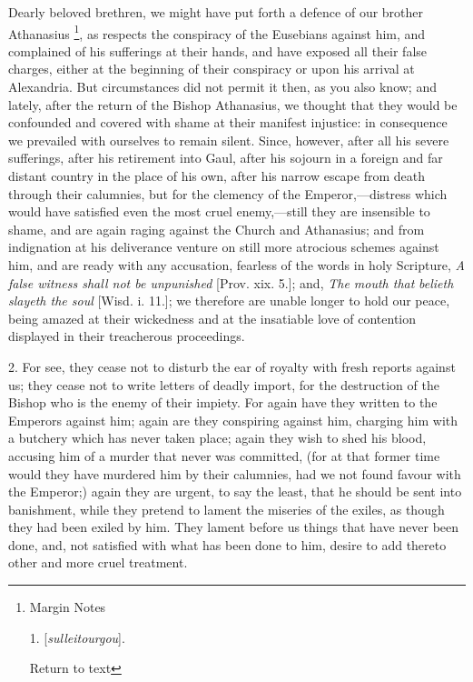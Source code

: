 Dearly beloved brethren, we might have put forth
a defence of our brother Athanasius \footnote{Margin Notes

1. [\emph{sulleitourgou}].

Return to text}, as respects the conspiracy of the Eusebians against him, and
complained of his sufferings at their hands, and have exposed all
their false charges, either at the beginning of their conspiracy or
upon his arrival at Alexandria. But circumstances did not permit it
then, as you also know; and lately, after the return of the Bishop
Athanasius, we thought that they would be confounded and covered with
shame at their manifest injustice: in consequence we prevailed with
ourselves to remain silent. Since, however, after all his severe
sufferings, after his retirement into Gaul, after his sojourn in a
foreign and far distant country in the place of his own, after his
narrow escape from death through their calumnies, but for the clemency
of the Emperor,—distress which would have satisfied even the most
cruel enemy,—still they are insensible to shame, and are again
raging against the Church and Athanasius; and from indignation at his
deliverance venture on still more atrocious schemes against him, and
are ready with any accusation, fearless of the words in holy
Scripture, \emph{A false witness shall not be unpunished} [Prov. xix.
5.]; and, \emph{The mouth that} \emph{belieth slayeth the soul} [Wisd.
i. 11.]; we therefore are unable longer to hold our peace, being
amazed at their wickedness and at the insatiable love of contention
displayed in their treacherous proceedings.

2. For see, they cease not to disturb the ear of
royalty with fresh reports against us; they cease not to write letters
of deadly import, for the destruction of the Bishop who is the enemy
of their impiety. For again have they written to the Emperors against
him; again are they conspiring against him, charging him with a
butchery which has never taken place; again they wish to shed his
blood, accusing him of a murder that never was committed, (for at that
former time would they have murdered him by their calumnies, had we
not found favour with the Emperor;) again they are urgent, to say the
least, that he should be sent into banishment, while they pretend to
lament the miseries of the exiles, as though they had been exiled by
him. They lament before us things that have never been done, and, not
satisfied with what has been done to him, desire to add thereto other
and more cruel treatment.

